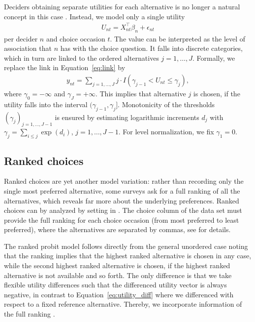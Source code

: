 \documentclass[article,shortnames]{jss}
\newcommand{\fct}[1]{\code{#1()}}
\begin{document}
Deciders obtaining separate utilities for each alternative is no longer a natural concept in this case \citep[Ch.\ 7.4]{Train:2009}. Instead, we model only a single utility
%
\begin{align*}
  U_{nt} = X_{nt}^\top \beta_n + \epsilon_{nt}
\end{align*}
%
per decider $n$ and choice occasion $t$. The value can be interpreted as the level of association that $n$ has with the choice question. It falls into discrete categories, which in turn are linked to the ordered alternatives $j=1,\dots,J$. Formally, we replace the link in Equation~\ref{eq:link} by
%
\begin{align*}
   y_{nt} = \sum_{j = 1,\dots,J} j \cdot I(\gamma_{j-1} < U_{nt} \leq \gamma_{j}),
\end{align*}
%
where $\gamma_0 = -\infty$ and $\gamma_J = +\infty$. This implies that alternative $j$ is chosen, if the utility falls into the interval $(\gamma_{j-1}, \gamma_j]$. Monotonicity of the thresholds $(\gamma_j)_{j=1,\dots,J-1}$ is ensured by estimating logarithmic increments $d_j$ with $\gamma_j = \sum_{i\leq j} \exp{(d_i)}$, $j=1,\dots,J-1$. For level normalization, we fix $\gamma_1 = 0$.

\subsection{Ranked choices} \label{subsec:ranked_choices}

Ranked choices are yet another model variation: rather than recording only the single most preferred alternative, some surveys ask for a full ranking of all the alternatives, which reveals far more about the underlying preferences. Ranked choices can by analyzed by setting  in \fct{prepare\_data}. The choice column of the data set must provide the full ranking for each choice occasion (from most preferred to least preferred), where the alternatives are separated by commas, see  for details.

The ranked probit model follows directly from the general unordered case noting that the ranking implies that the highest ranked alternative is chosen in any case, while the second highest ranked alternative is chosen, if the highest ranked alternative is not available and so forth. The only difference is that we take flexible utility differences such that the differenced utility vector is always negative, in contrast to Equation~\ref{eq:utility_diff} where we differenced with respect to a fixed reference alternative. Thereby, we incorporate information of the full ranking \citep[Ch.\ 7.3]{Train:2009}.
\end{document}
